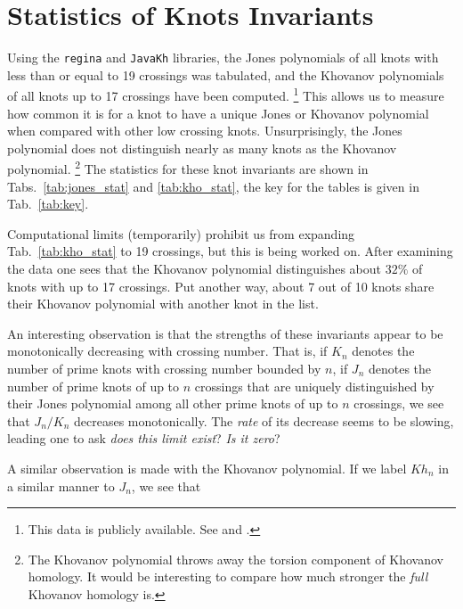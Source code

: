 \section{Statistics of Knots Invariants}
    Using the \texttt{regina} and \texttt{JavaKh} libraries, the Jones
    polynomials of all knots with less than or equal to 19 crossings was
    tabulated, and the Khovanov polynomials of all knots up to 17 crossings
    have been computed.%
    \footnote{%
        This data is publicly available. See
        \cite{JonesData} and \cite{KhovanovData}.
    }
    This allows us to measure how common it is for a knot
    to have a unique Jones or Khovanov polynomial when compared with other
    low crossing knots. Unsurprisingly, the Jones polynomial does not
    distinguish nearly as many knots as the Khovanov polynomial.%
    \footnote{%
        The Khovanov polynomial throws away the torsion component of
        Khovanov homology. It would be interesting to compare how much
        stronger the \textit{full} Khovanov homology is.
    }
    The statistics for these knot invariants are shown in
    Tabs.~\ref{tab:jones_stat} and \ref{tab:kho_stat}, the key for the
    tables is given in Tab.~\ref{tab:key}.
    \par\hfill\par
    Computational limits (temporarily) prohibit us from expanding
    Tab.~\ref{tab:kho_stat} to 19 crossings, but this is being worked on.
    After examining the data one sees that the Khovanov polynomial
    distinguishes about $32\%$ of knots with up to 17 crossings. Put
    another way, about 7 out of 10 knots share their Khovanov polynomial
    with another knot in the list.
    \par\hfill\par
    An interesting observation is that the strengths of these invariants appear
    to be monotonically decreasing with crossing number. That is, if
    $K_{n}$ denotes the number of prime knots with crossing number bounded
    by $n$, if $J_{n}$ denotes the number of prime knots of up to $n$ crossings
    that are uniquely distinguished by their Jones polynomial among all other
    prime knots of up to $n$ crossings, we see that
    $J_{n}/K_{n}$ decreases monotonically. The \textit{rate} of its decrease
    seems to be slowing, leading one to ask \textit{does this limit exist}?
    \textit{Is it zero}?
    \par\hfill\par
    A similar observation is made with the Khovanov polynomial. If we label
    $Kh_{n}$ in a similar manner to $J_{n}$, we see that
